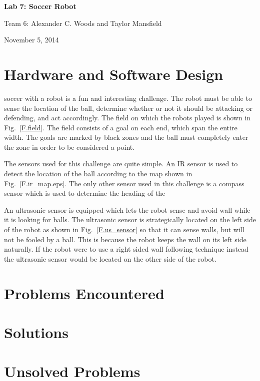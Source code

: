 \documentclass[journal]{../IEEEtran}
\begin{document}
\begin{titlepage}
    \vspace*{\fill}
    \begin{center}
      {\LARGE \bf Lab 7: Soccer Robot}

      {Team 6: Alexander  C. Woods and Taylor Mansfield}

      November 5, 2014
    \end{center}
    \vspace*{\fill}
  \end{titlepage}


\section{Hardware and Software Design}\label{S.design}
 soccer with a robot is a fun and interesting challenge. The robot must be able to sense the location of the ball, determine whether or not it should be attacking or defending, and act accordingly. The field on which the robots played is shown in Fig.~\ref{F.field}. The field consists of a goal on each end, which span the entire width. The goals are marked by black zones and the ball must completely enter the zone in order to be considered a point.


The sensors used for this challenge are quite simple. An IR sensor is used to detect the location of the ball according to the map shown in Fig.~\ref{F.ir_map.eps}. The only other sensor used in this challenge is a compass sensor which is used to determine the heading of the 

An ultrasonic sensor is equipped which lets the robot sense and avoid wall while it is looking for balls. The ultrasonic sensor is strategically located on the left side of the robot as shown in Fig.~\ref{F.us_sensor} so that it can sense walls, but will not be fooled by a ball. This is because the robot keeps the wall on its left side naturally. If the robot were to use a right sided wall following technique instead the ultrasonic sensor would be located on the other side of the robot.

\section{Problems Encountered}\label{S.problems}



\section{Solutions}\label{S.solutions}



\section{Unsolved Problems}\label{S.unsolved}
\end{document}
